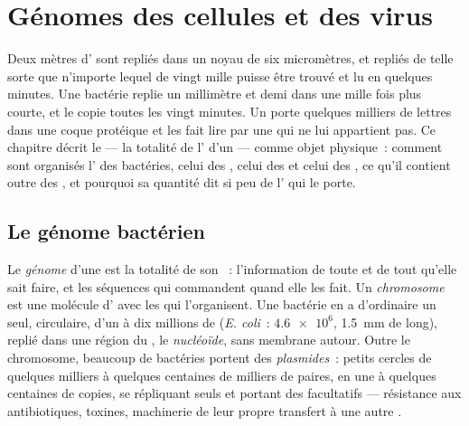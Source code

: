 \chapter{Génomes des cellules et des virus}\label{ch:b1:genomes}

Deux mètres d' sont repliés dans un noyau de six micromètres, et
repliés de telle sorte que n'importe lequel de vingt mille  puisse
être trouvé et lu en quelques minutes. Une bactérie replie un
millimètre et demi dans une  mille fois plus courte, et le copie
toutes les vingt minutes. Un  porte quelques milliers de lettres
dans une coque protéique et les fait lire par une  qui ne lui
appartient pas. Ce chapitre décrit le \emph{} --- la totalité de
l' d'un  --- comme objet physique~: comment sont organisés
l' des bactéries, celui des , celui des 
et celui des , ce qu'il contient outre des , et pourquoi sa
quantité dit si peu de l' qui le porte.

\section{Le génome bactérien}

\begin{definition}\label{def:b1:genomes:genome}
Le \emph{génome} d'une  est la totalité de son
~: l'information de toute  et de tout  qu'elle sait faire,
et les séquences qui commandent quand elle les fait. Un
\emph{chromosome} est une molécule d' avec les
 qui l'organisent. Une bactérie en a d'ordinaire un seul,
circulaire, d'un à dix millions de  (\emph{E. coli}~:
$\num{4.6e6}$, \qty{1.5}{mm} de long), replié dans une région du
, le \emph{nucléoïde}, sans membrane autour.
Outre le chromosome, beaucoup de bactéries portent des
\emph{plasmides}~: petits cercles de quelques milliers à
quelques centaines de milliers de paires, en une à quelques centaines de
copies, se répliquant seuls et portant des  facultatifs ---
résistance aux antibiotiques, toxines, machinerie de leur propre
transfert à une autre .
\end{definition}

